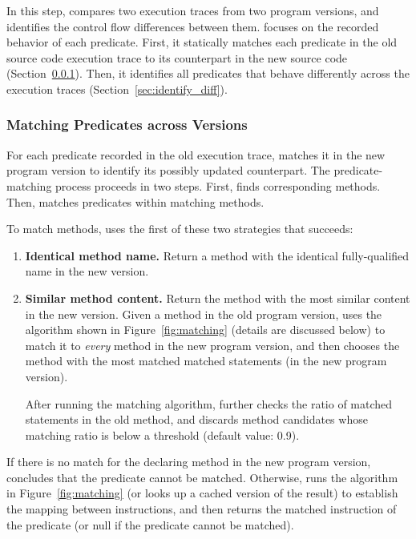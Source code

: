 

In this step, \ourtool compares two execution traces
from two program versions, and identifies the
control flow differences between them. \ourtool focuses on the
recorded behavior of each predicate.
First, it statically
matches each predicate in the old
source code execution trace to its counterpart in the new source code
(Section~\ref{sec:match_predicate}).
Then, it identifies all predicates that
behave differently across the execution traces (Section~\ref{sec:identify_diff}).


\subsubsection{Matching Predicates across Versions}
\label{sec:match_predicate}

For each predicate recorded in the old execution trace,
\ourtool matches it in the new program version to identify
its possibly updated counterpart.
The predicate-matching process proceeds in two steps.
First, \ourtool finds corresponding methods.
Then, \ourtool matches predicates within matching methods.

To match methods, \ourtool uses
the first of these two strategies that succeeds:


\vspace{-1mm}

\begin{enumerate}
\item \textbf{Identical method name.} Return a method with the identical
fully-qualified name in the new version.
\item \textbf{Similar method content.} Return the method with
the most similar content in the new version. Given
a method in the old program version, \ourtool
uses the algorithm shown in Figure~\ref{fig:matching}
(details are discussed below) to match it
to \textit{every} method in the new program version, and then
chooses the method with the most matched matched statements
(in the new program version).

After running the matching algorithm, \ourtool further checks the ratio of
matched statements in the old method, and discards method candidates whose
matching ratio is below a threshold (default value: 0.9).
\end{enumerate}


If there is no match for the declaring method in the new program
version, \ourtool concludes that the predicate cannot be
matched. Otherwise, \ourtool runs the algorithm
in Figure~\ref{fig:matching} (or looks up a cached version of the result)
to establish the mapping between
instructions, and then returns the matched instruction of the
predicate (or null if the predicate cannot be matched).


